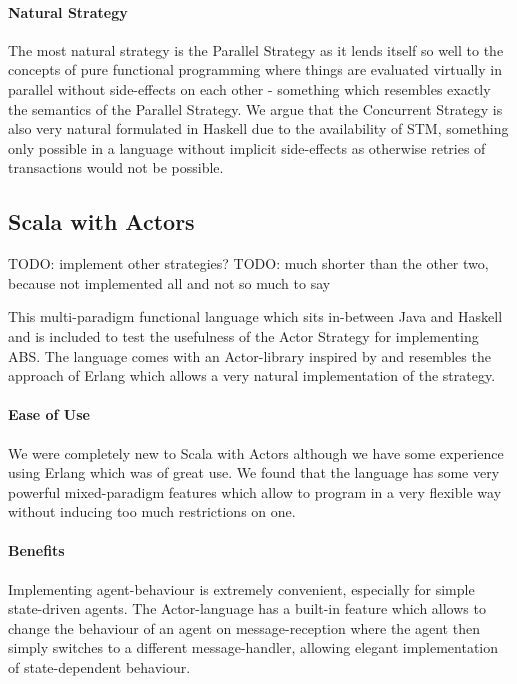 \paragraph{Natural Strategy}
The most natural strategy is the Parallel Strategy as it lends itself so well to the concepts of pure functional programming where things are evaluated virtually in parallel without side-effects on each other - something which resembles exactly the semantics of the Parallel Strategy. We argue that the Concurrent Strategy is also very natural formulated in Haskell due to the availability of STM, something only possible in a language without implicit side-effects as otherwise retries of transactions would not be possible.



\subsection{Scala with Actors}
TODO: implement other strategies?
TODO: much shorter than the other two, because not implemented all and not so much to say

This multi-paradigm functional language which sits in-between Java and Haskell and is included to test the usefulness of the Actor Strategy for implementing ABS. The language comes with an Actor-library inspired by \cite{agha_actors:_1986} and resembles the approach of Erlang which allows a very natural implementation of the strategy.

\paragraph{Ease of Use}
We were completely new to Scala with Actors although we have some experience using Erlang which was of great use. We found that the language has some very powerful mixed-paradigm features which allow to program in a very flexible way without inducing too much restrictions on one.

\paragraph{Benefits}
Implementing agent-behaviour is extremely convenient, especially for simple state-driven agents. The Actor-language has a built-in feature which allows to change the behaviour of an agent on message-reception where the agent then simply switches to a different message-handler, allowing elegant implementation of state-dependent behaviour. \\

